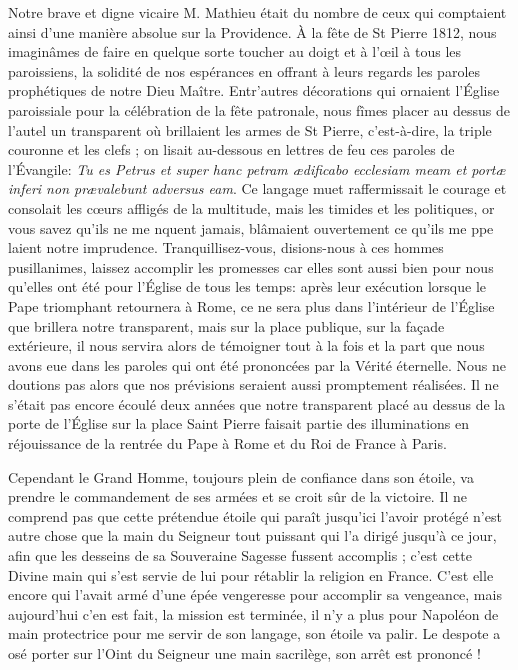 \documentclass[11pt,a4paper]{report}
\begin{document}
Notre brave et digne vicaire M. Mathieu était du nombre de ceux qui comptaient ainsi d'une manière absolue sur la Providence. À la fête de St Pierre 1812, nous imaginâmes de faire en quelque sorte toucher au doigt et à l'œil à tous les paroissiens, la solidité de nos espérances en offrant à leurs regards les paroles prophétiques de notre Dieu Maître. Entr'autres décorations qui ornaient l'Église paroissiale pour la célébration de la fête patronale, nous fîmes placer au dessus de l'autel un transparent où brillaient les armes de St Pierre, c'est-à-dire, la triple couronne et les clefs ; on lisait au-dessous en lettres de feu ces paroles de l'Évangile: \textit{Tu es Petrus et super hanc petram ædificabo ecclesiam meam et portæ inferi non prævalebunt adversus eam}. Ce langage muet raffermissait le courage et consolait les cœurs affligés de la multitude, mais les timides et les politiques, or vous savez qu'ils ne me nquent jamais, blâmaient ouvertement ce qu'ils me ppe laient notre imprudence. Tranquillisez-vous, disions-nous à ces hommes pusillanimes, laissez accomplir les promesses car elles sont aussi bien pour nous qu'elles ont été pour l'Église de tous les temps: après leur exécution lorsque le Pape triomphant retournera à Rome, ce ne sera plus dans l'intérieur de l'Église que brillera notre transparent, mais sur la place publique, sur la façade extérieure, il nous servira alors de témoigner tout à la fois et la part que nous avons eue dans les paroles qui ont été prononcées par la Vérité éternelle. Nous ne doutions pas alors que nos prévisions seraient aussi promptement réalisées. Il ne s'était pas encore écoulé deux années que notre transparent placé au dessus de la porte de l'Église sur la place Saint Pierre faisait partie des illuminations en réjouissance de la rentrée du Pape à Rome et du Roi de France à Paris.

Cependant le Grand Homme, toujours plein de confiance dans son étoile, va prendre le commandement de ses armées et se croit sûr de la victoire. Il ne comprend pas que cette prétendue étoile qui paraît jusqu'ici l'avoir protégé n'est autre chose que la main du Seigneur tout puissant qui l'a dirigé jusqu'à ce jour, afin que les desseins de sa Souveraine Sagesse fussent accomplis ; c'est cette Divine main qui s'est servie de lui pour rétablir la religion en France. C'est elle encore qui l'avait armé d'une épée vengeresse pour accomplir sa vengeance, mais aujourd'hui c'en est fait, la mission est terminée, il n'y a plus pour Napoléon de main protectrice pour me servir de son langage, son étoile va palir. Le despote a osé porter sur l'Oint du Seigneur une main sacrilège, son arrêt est prononcé !
\end{document}
